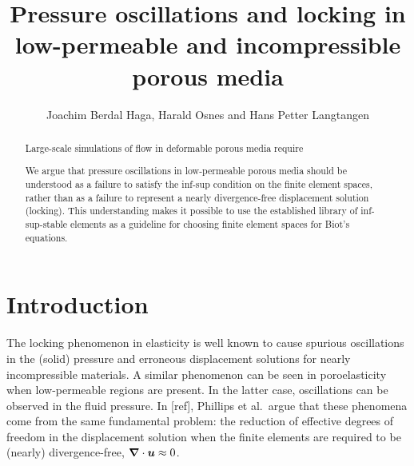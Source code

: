 





\noreceived{}%
\norevised{}%
\noaccepted{}%

\title{Pressure oscillations and locking in low-permeable and incompressible porous media}
\author{
  Joachim Berdal Haga\comma{}\comma\corrauth,
  Harald Osnes\comma{} and
  Hans Petter Langtangen\comma{}}
\address{%
\ Scientific Computing Department, Simula Research Laboratory, Norway\\
\ Department of Mathematics, University of Oslo, Norway\\
\ Department of Informatics, University of Oslo, Norway\\
\todop{\version}
}

\begin{abstract}
%
Large-scale simulations of flow in deformable porous media require

We argue that pressure oscillations in low-permeable porous media should be
understood as a failure to satisfy the inf-sup condition on the finite element
spaces, rather than as a failure to represent a nearly divergence-free
displacement solution (locking).
This understanding makes it possible to use the established library of
inf-sup-stable elements as a guideline for choosing finite element spaces
for Biot's equations.
\end{abstract}

\section{Introduction}
The locking phenomenon in elasticity is well known to cause spurious
oscillations in the (solid) pressure and erroneous displacement solutions for
nearly incompressible materials.
A similar phenomenon can be seen in poroelasticity when low-permeable regions
are present.
In the latter case, oscillations can be observed in the fluid pressure. In
[ref], Phillips et al.~argue that these phenomena come from the same
fundamental problem: the reduction of effective degrees of freedom in the
displacement solution when the finite elements are required to be (nearly)
divergence-free, $\nabla \cdot \U\approx 0$.


